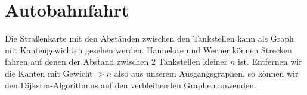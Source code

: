 \documentclass[a4paper,10pt]{article}
\begin{document}
\section{Autobahnfahrt}
Die Straßenkarte mit den Abständen zwischen den Tankstellen kann als Graph mit Kantengewichten gesehen werden.
Hannelore und Werner können Strecken fahren auf denen der Abstand zwischen 2 Tankstellen kleiner $n$ ist. 
Entfernen wir die Kanten mit Gewicht $> n$ also aus unserem Ausgangsgraphen, so können wir den Dijkstra-Algorithmus auf den verbleibenden Graphen anwenden.
\end{document}
